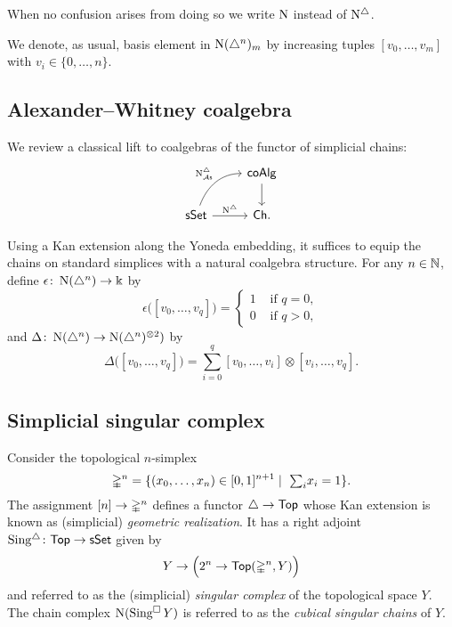 When no confusion arises from doing so we write $\operatorname{N}$ instead of $\operatorname{N^{\triangle}}$.

We denote, as usual, basis element in $\operatorname{N}(\triangle^n)_m$ by increasing tuples $[v_0, \dots, v_m]$ with $v_i \in \{0, \dots, n\}$.

\subsection{Alexander--Whitney coalgebra} \label{ss:aw coalgebra}

We review a classical lift to coalgebras of the functor of simplicial chains:
\begin{equation*}
\begin{tikzcd}
& \coAlg \arrow[d] \\
\sSet \arrow[r, "\schains"] \arrow[ur, "\schainsAS", out=70, in=180] & \Ch.
\end{tikzcd}
\end{equation*}

Using a Kan extension along the Yoneda embedding, it suffices to equip the chains on standard simplices with a natural coalgebra structure.
For any $n \in \mathbb{N}$, define $\epsilon  \colon \operatorname{N}(\triangle^n) \to \Bbbk$ by
\begin{equation*}
\epsilon \big( [v_0, \dots, v_q] \big) = \begin{cases} 1 & \text{ if } q = 0, \\ 0 & \text{ if } q>0, \end{cases}
\end{equation*}
and $\Delta \colon \operatorname{N}(\triangle^n) \to \operatorname{N}(\triangle^n)^{\otimes2})$ by
\begin{equation*}
\Delta \big( [v_0, \dots, v_q] \big) = \sum_{i=0}^q [v_0, \dots, v_i] \otimes [v_i, \dots, v_q].
\end{equation*}

\subsection{Simplicial singular complex}

Consider the topological $n$-simplex
\begin{equation*}
\mathbb{\Delta}^{n} = \{(x_0, \dots, x_n) \in [0,1]^{n+1} \mid \ \textstyle{\sum}_i x_i = 1\}.
\end{equation*}
The assignment $[n] \to \mathbb{\Delta}^n$ defines a functor $\triangle \to \mathsf{Top}$ whose Kan extension is known as (simplicial) \textit{geometric realization}.
It has a right adjoint $\operatorname{Sing^{\triangle}} \colon \mathsf{Top} \to \mathsf{sSet}$ given by
\begin{equation*}
Y \to \Big( 2^n \to \mathsf{Top}(\mathbb{\Delta}^n, Y) \Big)
\end{equation*}
and referred to as the (simplicial) \textit{singular complex} of the topological space $Y$.
The chain complex $\operatorname{N}(\operatorname{Sing^{\square}} Y)$ is referred to as the \textit{cubical singular chains} of $Y$.

